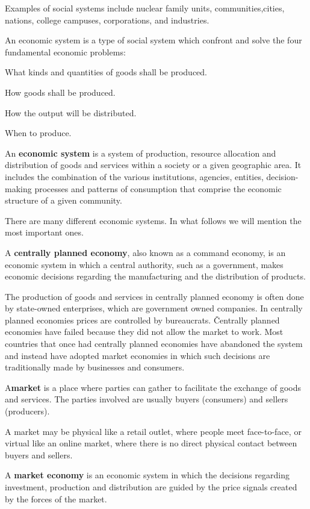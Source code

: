 \be
Examples of social systems include nuclear family units, communities,cities, nations, college campuses, corporations,
and industries.
\ee

An economic system is a type of social system which confront and solve the four fundamental economic problems:
\bit
\item What kinds and quantities of goods shall be produced.
\item How goods shall be produced.
\item How the output will be distributed.
\item When to produce.
\eit

An \textbf{economic system} is a system of production, resource allocation and distribution of goods and services
within a society or a given geographic area. It includes the combination of the various institutions, agencies,
entities, decision-making processes and patterns of consumption that comprise the economic structure of a given
community.
\ed

There are many different economic systems. In what follows we will mention the most important ones.

A \textbf{centrally planned economy}, also known as a command economy, is an economic system in which a central
authority, such as a government, makes economic decisions regarding the manufacturing and the distribution of
products.
\ed

The production of goods and services in centrally planned economy is often done by state-owned enterprises, which are
government owned companies. In centrally planned economies prices are controlled by bureaucrats. \v

Centrally planned economies have failed because they did not allow the market to work. Most countries that once had
centrally planned economies have abandoned the system and instead have adopted market economies in which such
decisions are traditionally made by businesses and consumers.

\bd[Market]
A\textbf{market} is a place where parties can gather to facilitate the exchange of goods and services. The parties
involved are usually buyers (consumers) and sellers (producers).
\ed

A market may be physical like a retail outlet, where people meet face-to-face, or virtual like an online market,
where there is no direct physical contact between buyers and sellers.

A \textbf{market economy} is an economic system in which the decisions regarding investment, production and
distribution are guided by the price signals created by the forces of the market.
\ed

